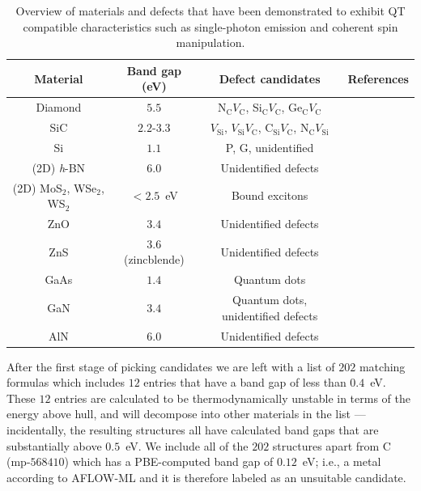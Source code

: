 \documentclass[superscriptaddress,unsortedaddress,
 amsmath,amssymb,
 aps,
]{revtex4-2}
\begin{document}
\begin{table}[b]
    \centering 
    \caption{Overview of materials and defects that have been demonstrated to exhibit QT compatible characteristics such as single-photon emission and coherent spin manipulation.}
    \begin{tabular}{c|c|c|c}
    Material & Band gap (eV) & Defect candidates & References \\
    \hline
    Diamond  & $5.5$  & N$_\mathrm{C}V_\mathrm{C}$, Si$_\mathrm{C}V_\mathrm{C}$, Ge$_\mathrm{C}V_\mathrm{C}$ & \cite{Taylor2008,Balasubramanian_2009,Barclay2011,Gordon2013,Rogers_2014,Bhaskar_2018} \\ 
    SiC & $2.2$-$3.3$ & $V_\mathrm{Si}$, $V_\mathrm{Si}V_\mathrm{C}$, C$_\mathrm{Si}V_\mathrm{C}$, N$_\mathrm{C}V_\mathrm{Si}$ & \cite{Widmann2014,Christle_2015,Castelletto_2014,Zargaleh_2018}  \cite{Weber2010, Son2020, Falk2013} \\ 
    Si & $1.1$ & P, G, unidentified & \cite{Muhonen_2014,Durand_2020,Redjem2020} \\ 
    (2D) \textit{h}-BN & $6.0$ & Unidentified defects & \cite{Tran_2016,Tran_2016b,Hayee_2020} \\ 
    (2D) MoS$_2$, WSe$_2$, WS$_2$ & $<2.5$~eV & Bound excitons & \cite{Toth2019} \\
    ZnO & $3.4$ & Unidentified defects & \cite{Morfa2012} \\ 
    ZnS & $3.6$ (zincblende) & Unidentified defects & \cite{Stewart2019} \\ 
    GaAs & $1.4$ & Quantum dots & \cite{Bluhm2010} \\ 
    GaN & $3.4$ & Quantum dots, unidentified defects & \cite{Roux2017,Berhane2018} \\
    AlN & $6.0$ & Unidentified defects & \cite{Xue2020}\\
    \end{tabular}
    \label{tab:qt-materials}
\end{table} 

After the first stage of picking candidates we are left with a list of $202$ matching formulas which includes $12$ entries that have a band gap of less than $0.4$~eV. These $12$ entries are calculated to be thermodynamically unstable in terms of the energy above hull, and will decompose into other materials in the list --- incidentally, the resulting structures all have calculated band gaps that are substantially above $0.5$~eV. We include all of the $202$ structures apart from C (mp-$568410$) which has a PBE-computed band gap of $0.12$~eV; i.e., a metal according to AFLOW-ML and it is therefore labeled as an unsuitable candidate. 
 
\end{document}
